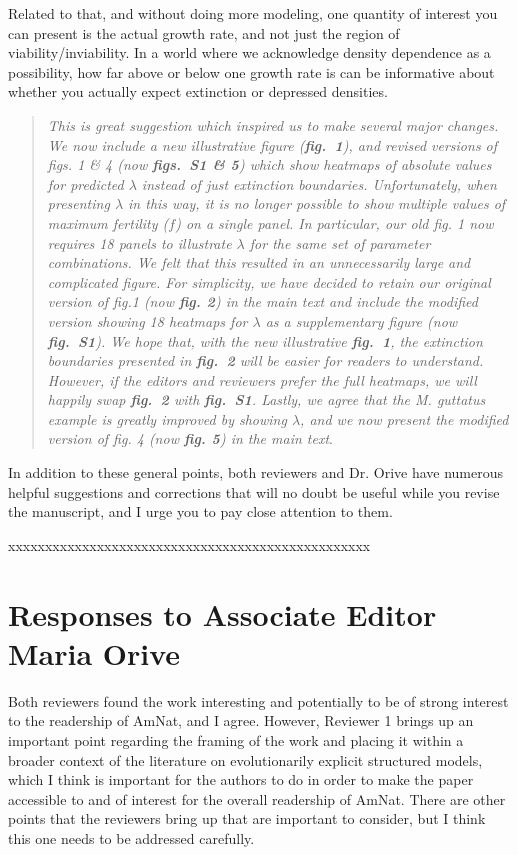 \documentclass[11pt]{article}
\begin{document}
Related to that, and without doing more modeling, one quantity of interest you can present is the actual growth rate, and not just the region of viability/inviability. In a world where we acknowledge density dependence as a possibility, how far above or below one growth rate is can be informative about whether you actually expect extinction or depressed densities.

\begin{quote}
	{\itshape This is great suggestion which inspired us to make several major changes. We now include a new illustrative figure ({\bf fig.~1}), and revised versions of figs. 1 \& 4 (now {\bf figs.~S1 \& 5}) which show heatmaps of absolute values for predicted $\lambda$ instead of just extinction boundaries. Unfortunately, when presenting $\lambda$ in this way, it is no longer possible to show multiple values of maximum fertility ($f$) on a single panel. In particular, our old fig. 1 now requires 18 panels to illustrate $\lambda$ for the same set of parameter combinations. We felt that this resulted in an unnecessarily large and complicated figure. For simplicity, we have decided to retain our original version of fig.1 (now {\bf fig. 2}) in the main text and include the modified version showing 18 heatmaps for $\lambda$ as a supplementary figure (now {\bf fig.~S1}). We hope that, with the new illustrative {\bf fig.~1}, the extinction boundaries presented in {\bf fig.~2} will be easier for readers to understand. However, if the editors and reviewers prefer the full heatmaps, we will happily swap {\bf fig.~2} with {\bf fig.~S1}. Lastly, we agree that the {\itshape M. guttatus} example is greatly improved by showing $\lambda$, and we now present the modified version of fig. 4 (now {\bf fig. 5}) in the main text}.
\end{quote}


In addition to these general points, both reviewers and Dr. Orive have numerous helpful suggestions and corrections that will no doubt be useful while you revise the manuscript, and I urge you to pay close attention to them.
\bigskip


\noindent xxxxxxxxxxxxxxxxxxxxxxxxxxxxxxxxxxxxxxxxxxxxxxxxx

\section*{Responses to Associate Editor Maria Orive}

Both reviewers found the work interesting and potentially to be of strong interest to the readership of AmNat, and I agree. However, Reviewer 1 brings up an important point regarding the framing of the work and placing it within a broader context of the literature on evolutionarily explicit structured models, which I think is important for the authors to do in order to make the paper accessible to and of interest for the overall readership of AmNat. There are other points that the reviewers bring up that are important to consider, but I think this one needs to be addressed carefully.
\end{document}
